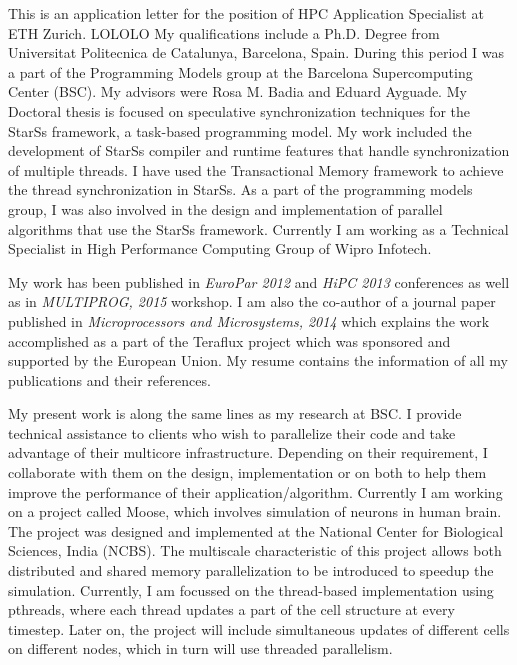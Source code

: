 \documentclass[10pt,stdletter,dateno]{newlfm}
\begin{document}
\begin{newlfm}
	   This is an application letter for the position of HPC Application Specialist at ETH Zurich. LOLOLO
	   My qualifications include a Ph.D. Degree from Universitat Politecnica de Catalunya, Barcelona, Spain. 
	   During this period I was a part of the Programming Models group at the Barcelona Supercomputing Center (BSC). 
	   My advisors were Rosa M. Badia and Eduard Ayguade. 
	   My Doctoral thesis is focused on speculative synchronization techniques for the StarSs framework, a task-based programming model.
	   My work included the development of StarSs compiler and runtime features that handle synchronization of multiple threads.
	   I have used the Transactional Memory framework to achieve the thread synchronization in StarSs.
	   As a part of the programming models group, I was also involved in the design and implementation of parallel algorithms that use the StarSs framework.
	   Currently I am working as a Technical Specialist in High Performance Computing Group of Wipro Infotech. 
%
\par
	   My work has been published in \textit{EuroPar 2012} and \textit{HiPC 2013} conferences as well as in \textit{MULTIPROG, 2015} workshop.  
	   I am also the co-author of a journal paper published in \textit{Microprocessors and Microsystems, 2014} which explains the work accomplished as a part of the Teraflux project which was sponsored and supported by the European Union. 
	   My resume contains the information of all my publications and their references. 
%
\par
	   My present work is along the same lines as my research at BSC. 
	   I provide technical assistance to clients who wish to parallelize their code and take advantage of their multicore infrastructure. 
	   Depending on their requirement, I collaborate with them on the design, implementation or on both to help them improve the performance of their application/algorithm.
	   Currently I am working on a project called Moose, which involves simulation of neurons in human brain. 
	   The project was designed and implemented at the National Center for Biological Sciences, India (NCBS). 
	   The multiscale characteristic of this project allows both distributed and shared memory parallelization to be introduced to speedup the simulation. 
	   Currently, I am focussed on the thread-based implementation using pthreads, where each thread updates a part of the cell structure at every timestep. 
	   Later on, the project will include simultaneous updates of different cells on different nodes, which in turn will use threaded parallelism. 

\end{newlfm}
\end{document}
